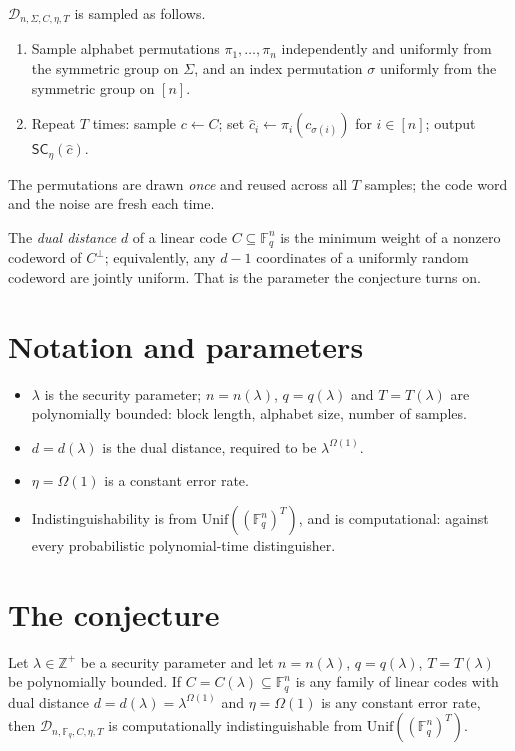 \documentclass{aicr-conjecture}
\newcommand{\Fq}{\mathbb{F}_{q}}
\newcommand{\SC}{\mathsf{SC}}
\newcommand{\Unif}{\mathrm{Unif}}
\newcommand{\D}{\mathcal{D}}
\begin{document}
\begin{definition}\label{def:dist}
$\D_{n,\Sigma,C,\eta,T}$ is sampled as follows.
\begin{enumerate}[nosep]
  \item Sample alphabet permutations $\pi_1, \dots, \pi_n$ independently
    and uniformly from the symmetric group on $\Sigma$, and an index
    permutation $\sigma$ uniformly from the symmetric group on $[n]$.
  \item Repeat $T$ times: sample $c \leftarrow C$; set
    $\hat{c}_i \leftarrow \pi_i(c_{\sigma(i)})$ for $i \in [n]$; output
    $\SC_{\eta}(\hat{c})$.
\end{enumerate}
The permutations are drawn \emph{once} and reused across all $T$ samples;
the code word and the noise are fresh each time.
\end{definition}

The \emph{dual distance} $d$ of a linear code $C \subseteq \Fq^{n}$ is
the minimum weight of a nonzero codeword of $C^{\perp}$; equivalently,
any $d-1$ coordinates of a uniformly random codeword are jointly uniform.
That is the parameter the conjecture turns on.

\section{Notation and parameters}\label{sec:notation}

\begin{itemize}[nosep]
  \item $\lambda$ is the security parameter; $n = n(\lambda)$,
    $q = q(\lambda)$ and $T = T(\lambda)$ are polynomially bounded: block
    length, alphabet size, number of samples.
  \item $d = d(\lambda)$ is the dual distance, required to be
    $\lambda^{\Omega(1)}$.
  \item $\eta = \Omega(1)$ is a constant error rate.
  \item Indistinguishability is from
    $\Unif((\Fq^{n})^{T})$, and is computational: against every
    probabilistic polynomial-time distinguisher.
\end{itemize}

\section{The conjecture}\label{sec:conjectures}

\begin{conjecture}\label{conj:main}
Let $\lambda \in \mathbb{Z}^{+}$ be a security parameter and let
$n = n(\lambda)$, $q = q(\lambda)$, $T = T(\lambda)$ be polynomially
bounded. If $C = C(\lambda) \subseteq \Fq^{n}$ is any family of linear
codes with dual distance $d = d(\lambda) = \lambda^{\Omega(1)}$ and
$\eta = \Omega(1)$ is any constant error rate, then
$\D_{n,\Fq,C,\eta,T}$ is computationally indistinguishable from
$\Unif((\Fq^{n})^{T})$.
\end{conjecture}
\end{document}
